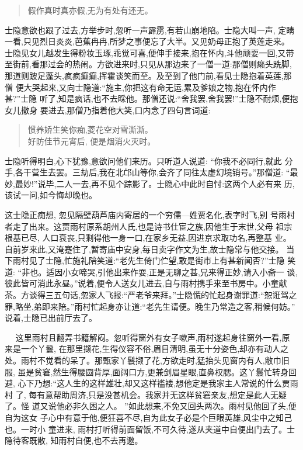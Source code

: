 \documentclass[nofonts]{ctexbook}
\newcommand*{\wei}{\CJKfamily{xinwei}}    %
\begin{document}
\begin{verse} \wei
    假作真时真亦假,无为有处有还无。
\end{verse}

    士隐意欲也跟了过去,方举步时,忽听一声霹雳,有若山崩地陷。士隐大叫一声,
定睛一看,只见烈日炎炎,芭蕉冉冉,所梦之事便忘了大半。又见奶母正抱了英莲走来。
士隐见女儿越发生得粉妆玉琢,乖觉可喜,便伸手接来,抱在怀内,斗他顽耍一回,又带
至街前,看那过会的热闹。方欲进来时,只见从那边来了一僧一道:那僧则癞头跣脚,
那道则跛足蓬头,疯疯癫癫,挥霍谈笑而至。及至到了他门前,看见士隐抱着英莲,那僧
便大哭起来,又向士隐道:``施主,你把这有命无运,累及爹娘之物,抱在怀内作甚?''士隐
听了,知是疯话,也不去睬他。那僧还说:``舍我罢,舍我罢!''士隐不耐烦,便抱女儿撤身
要进去,那僧乃指着他大笑,口内念了四句言词道:


\begin{verse} \wei
    惯养娇生笑你痴,菱花空对雪澌澌。\\
    好防佳节元宵后, 便是烟消火灭时。
\end{verse}

    士隐听得明白,心下犹豫,意欲问他们来历。只听道人说道: ``你我不必同行,就此
分手,各干营生去罢。三劫后,我在北邙山等你,会齐了同往太虚幻境销号。''那僧道:
``最妙,最妙!''说毕,二人一去,再不见个踪影了。士隐心中此时自忖:这两个人必有来
历,该试一问,如今悔却晚也。


    这士隐正痴想, 忽见隔壁葫芦庙内寄居的一个穷儒---姓贾名化,表字时飞,别
号雨村者走了出来。这贾雨村原系胡州人氏,也是诗书仕宦之族,因他生于末世,父母
祖宗根基已尽, 人口衰丧,只剩得他一身一口,在家乡无益,因进京求取功名,再整基
业。自前岁来此,又淹蹇住了,暂寄庙中安身,每日卖字作文为生,故士隐常与他交接。
当下雨村见了士隐,忙施礼陪笑道:``老先生倚门伫望,敢是街市上有甚新闻否?''士隐
笑道: ``非也。适因小女啼哭,引他出来作耍,正是无聊之甚,兄来得正妙,请入小斋一
谈,彼此皆可消此永昼。''说着,便令人送女儿进去,自与雨村携手来至书房中。小童献
茶。方谈得三五句话,忽家人飞报:``严老爷来拜。''士隐慌的忙起身谢罪道:``恕诳驾之
罪,略坐,弟即来陪。''雨村忙起身亦让道:``老先生请便。晚生乃常造之客,稍候何妨。''
说着,士隐已出前厅去了。


　   这里雨村且翻弄书籍解闷。忽听得窗外有女子嗽声,雨村遂起身往窗外一看,原
来是一个丫鬟, 在那里撷花,生得仪容不俗,眉目清明,虽无十分姿色,却亦有动人之
处。雨村不觉看的呆了。那甄家丫鬟撷了花,方欲走时,猛抬头见窗内有人,敝巾旧服,
虽是贫窘,然生得腰圆背厚,面阔口方,更兼剑眉星眼,直鼻权腮。这丫鬟忙转身回避,
心下乃想:``这人生的这样雄壮,却又这样褴褛,想他定是我家主人常说的什么贾雨村
了, 每有意帮助周济,只是没甚机会。我家并无这样贫窘亲友,想定是此人无疑了。怪
道又说他必非久困之人。 ''如此想来,不免又回头两次。雨村见他回了头,便自为这女
子心中有意于他,便狂喜不尽,自为此女子必是个巨眼英雄,风尘中之知己也。一时小
童进来, 雨村打听得前面留饭,不可久待,遂从夹道中自便出门去了。士隐待客既散,
知雨村自便,也不去再邀。
\end{document}
